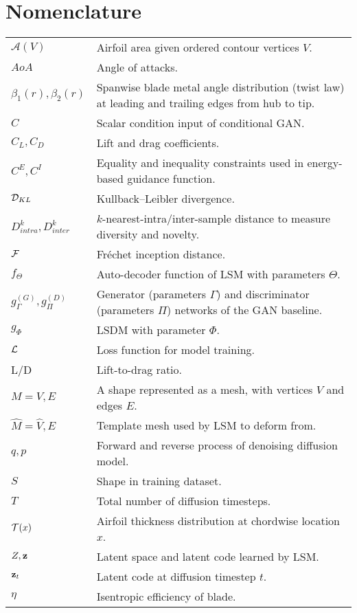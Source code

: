 \section{Nomenclature}
{\renewcommand\arraystretch{1.0}
\noindent\begin{longtable*}{@{}l @{\quad=\quad} l@{}}

$\mathcal{A}(V)$           & Airfoil area given ordered contour vertices $V$. \\
$AoA$           & Angle of attacks. \\
$\beta_1(r),\beta_2(r)$    & Spanwise blade metal angle distribution (twist law) at leading and trailing edges from hub to tip. \\
$C$                        & Scalar condition input of conditional GAN. \\
$C_L, C_D$                 & Lift and drag coefficients. \\
$C^E, C^I$                 & Equality and inequality constraints used in energy-based guidance function. \\
$\mathcal{D}_{KL}$                 & Kullback–Leibler divergence. \\
$D^k_{intra},D^k_{inter}$  & $k$-nearest-intra/inter-sample distance to measure diversity and novelty. \\
$\mathcal{F}$                      & Fréchet inception distance. \\
$f_\Theta$                 & Auto-decoder function of LSM with parameters $\Theta$. \\
$g_\Gamma^{(G)}, g_\Pi^{(D)}$ & Generator (parameters $\Gamma$) and discriminator (parameters $\Pi$) networks of the GAN baseline. \\
$g_\Phi$                   & LSDM with parameter $\Phi$. \\
$\mathcal{L}$                      & Loss function for model training. \\
L/D                        & Lift-to-drag ratio. \\
$M = {V, E}$               & A shape represented as a mesh, with vertices $V$ and edges $E$. \\
$\hat{M} = {\hat{V}, E}$   & Template mesh used by LSM to deform from. \\
$q, p$                     & Forward and reverse process of denoising diffusion model. \\
$S$                        & Shape in training dataset. \\
$T$                        & Total number of diffusion timesteps. \\
$\mathcal{T}(x)$                   & Airfoil thickness distribution at chordwise location $x$. \\
$Z,\mathbf{z}$                    & Latent space and latent code learned by LSM. \\
$\mathbf{z}_t$                    & Latent code at diffusion timestep $t$. \\
$\eta$                     & Isentropic efficiency of blade.

\end{longtable*}}


